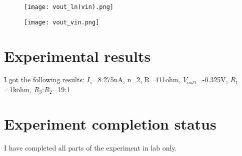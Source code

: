 \documentclass[12pt]{article}
\begin{document}
\begin{figure}[h!]

\centering
\texttt{[image: vout\_ln(vin).png]}
\end{figure}

\begin{figure}[h!]

\centering
\texttt{[image: vout\_vin.png]}
\end{figure}
\newpage

\section{Experimental results}

I got the following results:\newline
\(I_{s}\)=8.275nA, n=2, R=411ohm, \(V_{out1}\)=-0.325V,\newline
\(R_{1}\)=1kohm, \(R_{3}\):\(R_{2}\)=19:1
\section{Experiment completion status}
I have completed all parts of the experiment in lab only.
\end{document}
